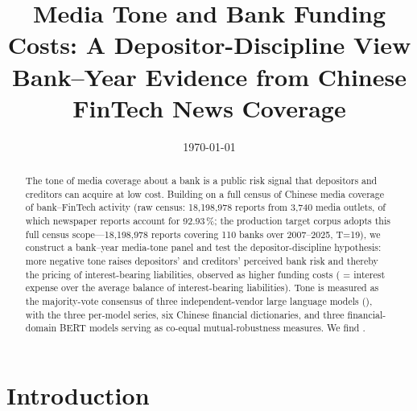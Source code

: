 




\title{Media Tone and Bank Funding Costs: A Depositor-Discipline View\\
       {\large Bank--Year Evidence from Chinese FinTech News Coverage}}
\author{}
\date{\today}


\maketitle

\begin{abstract}
The tone of media coverage about a bank is a public risk signal that
depositors and creditors can acquire at low cost. Building on a full
census of Chinese media coverage of bank--FinTech activity (raw census:
18{,}198{,}978 reports from 3{,}740 media outlets, of which newspaper
reports account for 92.93\,\%; the production target corpus adopts this
full census scope---18{,}198{,}978 reports covering 110 banks over
2007--2025, T=19), we
construct a bank--year media-tone panel and test the depositor-discipline
hypothesis: more negative tone raises depositors' and creditors'
perceived bank risk and thereby the pricing of interest-bearing
liabilities, observed as higher funding costs
( = interest expense over the average balance of
interest-bearing liabilities). Tone is measured as the majority-vote
consensus of three independent-vendor large language models
(), with the three per-model series, six
Chinese financial dictionaries, and three financial-domain BERT models
serving as co-equal mutual-robustness measures. We find
\@.
\end{abstract}

\section{Introduction}\label{sec:intro}

